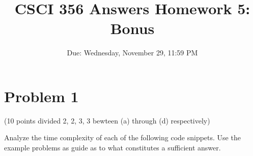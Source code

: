 \documentclass{article}
\title{CSCI 356 Answers Homework 5: Bonus}
\date{Due: Wednesday, November 29, 11:59 PM}
\begin{document}
\maketitle %



\section{Problem 1}

(10 points divided 2, 2, 3, 3 bewteen (a) through (d) respectively)

Analyze the time complexity of each of the following code snippets.
Use the example problems as guide as to what constitutes a sufficient answer.
\end{document}

